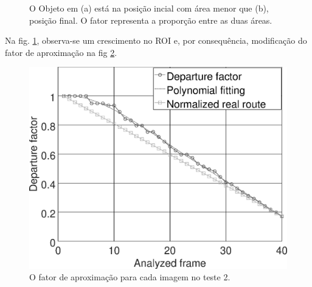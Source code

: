 \begin{figure}[H]
\centering
  \caption{O Objeto em (a) está na posição incial com área menor que (b), 
  posição final. O fator representa a proporção entre as duas áreas.}
  \label{fig:target}
\end{figure}

Na fig. \ref{fig:target}, observa-se um crescimento no ROI e, por
consequência, modificação do fator de aproximação na fig \ref{fig:res_grapha_b}.

\begin{figure}[H]
\includegraphics[width=\columnwidth]{images/grapha_b.eps}
\caption{O fator de aproximação para cada imagem no teste 2.}
\label{fig:res_grapha_b}
\end{figure}

